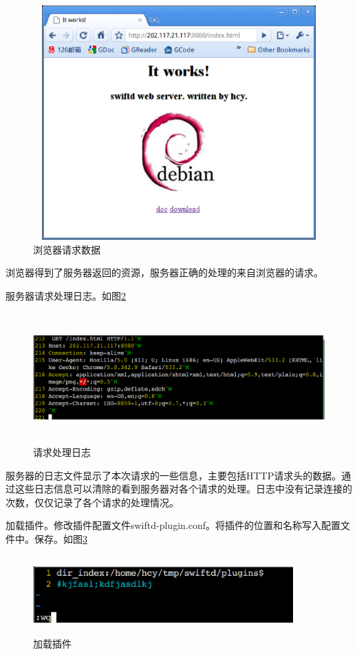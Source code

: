 \documentclass[twoside, xetex]{report}
\begin{document}
	\begin{figure}[htbp]
	\centering
	\includegraphics[height=9cm, width=12cm]{pics/access1.eps}
	\caption{浏览器请求数据}
	\label{access1}
	\end{figure}
	
	浏览器得到了服务器返回的资源，服务器正确的处理的来自浏览器的请求。
	
	服务器请求处理日志。如图\ref{access1log}
	
	\begin{figure}[htbp]
	\centering
	\includegraphics[height=5cm, width=15cm]{pics/access1log.eps}
	\caption{请求处理日志}
	\label{access1log}
	\end{figure}
	
	服务器的日志文件显示了本次请求的一些信息，主要包括HTTP请求头的数据。通过这些日志信息可以清除的看到服务器对各个请求的处理。日志中没有记录连接的次数，仅仅记录了各个请求的处理情况。
	
	
	加载插件。修改插件配置文件swiftd-plugin.conf。将插件的位置和名称写入配置文件中。保存。如图\ref{pluginconf}
	\begin{figure}[htbp]
	\centering
	\includegraphics[height=3cm, width=10cm]{pics/pluginconf.eps}
	\caption{加载插件}
	\label{pluginconf}
	\end{figure}
	
\end{document}
